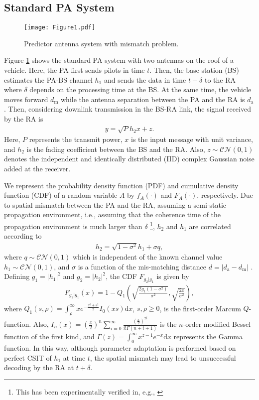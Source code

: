 \subsection{Standard PA System}
\begin{figure}
\centering
  \texttt{[image: Figure1.pdf]}\\
\caption{Predictor antenna system with mismatch problem.}\label{ARQmodel}
\end{figure}
Figure \ref{ARQmodel} shows the standard PA system with two antennas on the roof of a vehicle. Here, the PA first sends pilots in time $t$. Then, the base station (BS) estimates the PA-BS channel $h_1$ and sends the data in time $t+\delta$ to the RA where  $\delta$ depends on the processing time at the BS. At the same time, the vehicle moves forward $d_\text{m}$ while the antenna separation between the PA and the RA is $d_\text{a}$. Then, considering downlink transmission in the BS-RA link, the  signal received by the RA is
\begin{align}\label{eq_Y}
y = \sqrt{P}h_2 x + z.
\end{align}
Here, $P$ represents the transmit power, $x$ is the input message with unit variance, and $h_2$ is the fading coefficient between the BS and the RA. Also, $z \sim \mathcal{CN}(0,1)$ denotes the independent and identically distributed (IID) complex Gaussian noise added at the receiver.

We represent the probability density function (PDF) and cumulative density function (CDF) of a random variable $A$ by $f_A(\cdot)$ and $F_A(\cdot)$, respectively.  Due to spatial mismatch between the PA and the RA, assuming a semi-static propagation environment, i.e., assuming that the coherence time of the propagation environment is much larger than $\delta$ \footnote{This has been experimentally verified in, e.g., \cite{Jamaly2014EuCAPanalysis}}, $h_2$ and $h_1$ are correlated according to \cite[Eq. 5]{Guo2019WCLrate} 
\begin{align}\label{eq_H}
    h_2 = \sqrt{1-\sigma^2} h_1 + \sigma q,
\end{align}
where $q \sim \mathcal{CN}(0,1)$ which is independent of the known channel value $h_1\sim \mathcal{CN}(0,1)$, and $\sigma$ is a function of the mis-matching distance $d = |d_\text{a}-d_\text{m}|$ \cite[Eq. 4]{Guo2019WCLrate}. Defining $g_1 = |h_1|^2$ and $ g_2 = |h_2|^2$, the CDF $F_{g_2|g_1}$ is given by
\begin{align}\label{eq_cdf}
    F_{g_2|g_1}(x) = 1 - Q_1\left( \sqrt{\frac{2g_1(1-\sigma^2)}{\sigma^2}}, \sqrt{\frac{2x}{\sigma^2}}  \right),
\end{align}
where $Q_1(s,\rho) = \int_{\rho}^{\infty} xe^{-\frac{x^2+s^2}{2}}I_0(xs)\text{d}x$, $s, \rho \ge 0$, is the first-order Marcum $Q$-function. Also, $I_n(x) = (\frac{x}{2})^n \sum_{i=0}^{\infty}\frac{(\frac{x}{2})^{2i} }{i!\Gamma(n+i+1)}$ is the $n$-order modified Bessel function of the first kind, and $\Gamma(z) = \int_0^{\infty} x^{z-1}e^{-x} \mathrm{d}x$ represents the Gamma function. In this way, although parameter adaptation is performed based on perfect CSIT of $h_1$ at time $t$, the spatial mismatch may lead to unsuccessful decoding by the RA  at $t+\delta$.


